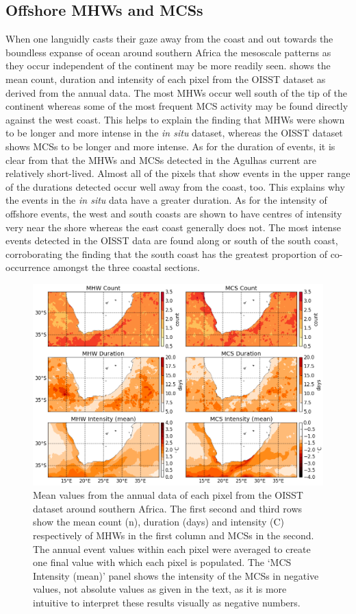 \documentclass[a4paper,10pt,review]{elsarticle}
\begin{document}
\subsection{Offshore MHWs and MCSs}
When one languidly casts their gaze away from the coast and out towards the boundless expanse of ocean around southern Africa the mesoscale patterns as they occur independent of the continent may be more readily seen.  shows the mean count, duration and intensity of each pixel from the OISST dataset as derived from the annual data. The most MHWs occur well south of the tip of the continent whereas some of the most frequent MCS activity may be found directly against the west coast. This helps to explain the finding that MHWs were shown to be longer and more intense in the \emph{in situ} dataset, whereas the OISST dataset shows MCSs to be longer and more intense. As for the duration of events, it is clear from  that the MHWs and MCSs detected in the Agulhas current are relatively short-lived. Almost all of the pixels that show events in the upper range of the durations detected occur well away from the coast, too. This explains why the events in the \emph{in situ} data have a greater duration. As for the intensity of offshore events, the west and south coasts are shown to have centres of intensity very near the shore whereas the east coast generally does not. The most intense events detected in the OISST data are found along or south of the south coast, corroborating the finding that the south coast has the greatest proportion of co-occurrence amongst the three coastal sections.

\begin{figure}
\centering \includegraphics[width=1.0\textwidth]{MHW_MCS_mean.png}
\caption{Mean values from the annual data of each pixel from the OISST dataset around southern Africa. The first second and third rows show the mean count (n), duration (days) and intensity (\degree C) respectively of MHWs in the first column and MCSs in the second. The annual event values within each pixel were averaged to create one final value with which each pixel is populated. The `MCS Intensity (mean)' panel shows the intensity of the MCSs in negative values, not absolute values as given in the text, as it is more intuitive to interpret these results visually as negative numbers.}
\label{fig:Figure6}
\end{figure}
\end{document}
